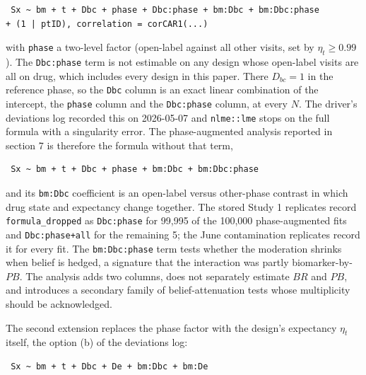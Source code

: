 \documentclass[
  11pt,
]{article}
\begin{document}
\begin{verbatim} Sx ~ bm + t + Dbc + phase + Dbc:phase + bm:Dbc + bm:Dbc:phase
+ (1 | ptID), correlation = corCAR1(...) \end{verbatim}

with \texttt{phase} a two-level factor (open-label against all other
visits, set by \(\eta_t \ge 0.99\)). The \texttt{Dbc:phase} term is not
estimable on any design whose open-label visits are all on drug, which
includes every design in this paper. There \(D_{bc} = 1\) in the reference
phase, so the \texttt{Dbc} column is an exact linear combination of the
intercept, the \texttt{phase} column and the \texttt{Dbc:phase} column, at
every \(N\). The driver's deviations log recorded this on 2026-05-07 and
\texttt{nlme::lme} stops on the full formula with a singularity error.
The phase-augmented analysis reported in section 7 is therefore the
formula without that term,

\begin{verbatim} Sx ~ bm + t + Dbc + phase + bm:Dbc + bm:Dbc:phase \end{verbatim}

and its \texttt{bm:Dbc} coefficient is an open-label versus other-phase
contrast in which drug state and expectancy change together. The stored
Study 1 replicates record \texttt{formula\_dropped} as \texttt{Dbc:phase}
for 99,995 of the 100,000 phase-augmented fits and
\texttt{Dbc:phase+all} for the remaining 5; the June contamination
replicates record it for every fit. The \texttt{bm:Dbc:phase} term tests
whether the moderation shrinks when belief is hedged, a signature that the
interaction was partly biomarker-by-\(PB\). The analysis adds two columns,
does not separately estimate \(BR\) and \(PB\), and introduces a secondary
family of belief-attenuation tests whose multiplicity should be
acknowledged.

The second extension replaces the phase factor with the design's
expectancy \(\eta_t\) itself, the option (b) of the deviations log:

\begin{verbatim} Sx ~ bm + t + Dbc + De + bm:Dbc + bm:De \end{verbatim}
\end{document}
